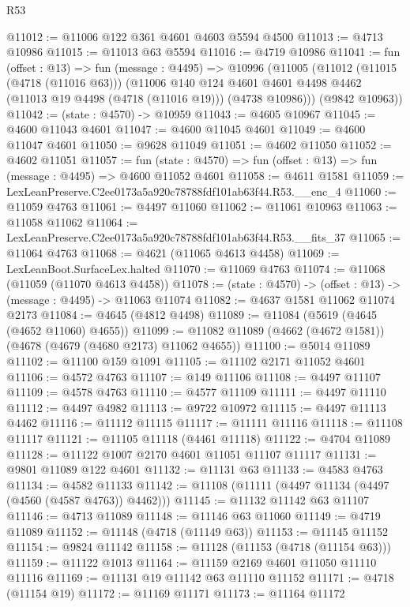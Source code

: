 \begin{lexlean}{R53}
\begin{coremodule}
@11012 := @11006 @122 @361 @4601 @4603 @5594 @4500
@11013 := @4713 @10986
@11015 := @11013 @63 @5594
@11016 := @4719 @10986
@11041 := fun (offset : @13) =>
  fun (message : @4495) =>
  @10996
    (@11005
      (@11012
        (@11015 (@4718 (@11016 @63)))
        (@11006
          @140
          @124
          @4601
          @4601
          @4498
          @4462
          (@11013 @19 @4498 (@4718 (@11016 @19)))
          (@4738 @10986)))
      (@9842 @10963))
@11042 := (state : @4570) -> @10959
@11043 := @4605 @10967
@11045 := @4600 @11043 @4601
@11047 := @4600 @11045 @4601
@11049 := @4600 @11047 @4601
@11050 := @9628 @11049
@11051 := @4602 @11050
@11052 := @4602 @11051
@11057 := fun (state : @4570) => fun (offset : @13) => fun (message : @4495) => @4600 @11052 @4601
@11058 := @4611 @1581
@11059 := LexLeanPreserve.C2ee0173a5a920c78788fdf101ab63f44.R53.__enc_4
@11060 := @11059 @4763
@11061 := @4497 @11060
@11062 := @11061 @10963
@11063 := @11058 @11062
@11064 := LexLeanPreserve.C2ee0173a5a920c78788fdf101ab63f44.R53.__fits_37
@11065 := @11064 @4763
@11068 := @4621 (@11065 @4613 @4458)
@11069 := LexLeanBoot.SurfaceLex.halted
@11070 := @11069 @4763
@11074 := @11068 (@11059 (@11070 @4613 @4458))
@11078 := (state : @4570) -> (offset : @13) -> (message : @4495) -> @11063 @11074
@11082 := @4637 @1581 @11062 @11074 @2173
@11084 := @4645 (@4812 @4498)
@11089 := @11084 (@5619 (@4645 (@4652 @11060) @4655))
@11099 := @11082 @11089 (@4662 (@4672 @1581)) (@4678 (@4679 (@4680 @2173) @11062 @4655))
@11100 := @5014 @11089
@11102 := @11100 @159 @1091
@11105 := @11102 @2171 @11052 @4601
@11106 := @4572 @4763
@11107 := @149 @11106
@11108 := @4497 @11107
@11109 := @4578 @4763
@11110 := @4577 @11109
@11111 := @4497 @11110
@11112 := @4497 @4982
@11113 := @9722 @10972
@11115 := @4497 @11113 @4462
@11116 := @11112 @11115
@11117 := @11111 @11116
@11118 := @11108 @11117
@11121 := @11105 @11118 (@4461 @11118)
@11122 := @4704 @11089
@11128 := @11122 @1007 @2170 @4601 @11051 @11107 @11117
@11131 := @9801 @11089 @122 @4601
@11132 := @11131 @63
@11133 := @4583 @4763
@11134 := @4582 @11133
@11142 := @11108 (@11111 (@4497 @11134 (@4497 (@4560 (@4587 @4763)) @4462)))
@11145 := @11132 @11142 @63 @11107
@11146 := @4713 @11089
@11148 := @11146 @63 @11060
@11149 := @4719 @11089
@11152 := @11148 (@4718 (@11149 @63))
@11153 := @11145 @11152
@11154 := @9824 @11142
@11158 := @11128 (@11153 (@4718 (@11154 @63)))
@11159 := @11122 @1013
@11164 := @11159 @2169 @4601 @11050 @11110 @11116
@11169 := @11131 @19 @11142 @63 @11110 @11152
@11171 := @4718 (@11154 @19)
@11172 := @11169 @11171
@11173 := @11164 @11172

\end{coremodule}
\end{lexlean}
